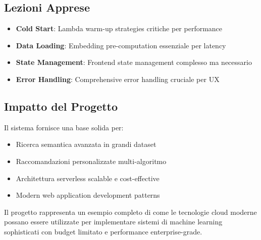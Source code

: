 \documentclass[11pt,a4paper]{article}
\begin{document}
\subsection{Lezioni Apprese}
\begin{itemize}
  \item \textbf{Cold Start}: Lambda warm-up strategies critiche per performance
  \item \textbf{Data Loading}: Embedding pre-computation essenziale per latency
  \item \textbf{State Management}: Frontend state management complesso ma necessario
  \item \textbf{Error Handling}: Comprehensive error handling cruciale per UX
\end{itemize}

\subsection{Impatto del Progetto}
Il sistema fornisce una base solida per:
\begin{itemize}
  \item Ricerca semantica avanzata in grandi dataset
  \item Raccomandazioni personalizzate multi-algoritmo
  \item Architettura serverless scalable e cost-effective
  \item Modern web application development patterns
\end{itemize}

Il progetto rappresenta un esempio completo di come le tecnologie cloud moderne possano essere utilizzate per implementare sistemi di machine learning sophisticati con budget limitato e performance enterprise-grade.
\end{document}
